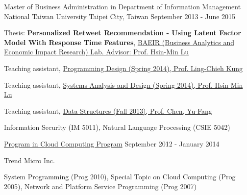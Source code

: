 

\begin{cventries}

  \cventry
    {Master of Business Administration in Department of Information Management} %
    {National Taiwan University} %
    {Taipei City, Taiwan} %
    {September 2013 - June 2015} %
    {
      \begin{cvitems} %
        \item {Thesis: \textbf{Personalized Retweet Recommendation - Using Latent Factor Model With Response Time Features}, \href{http://im.ntu.edu.tw/~lu/research_dir.htm}{BAEIR (Business Analytics and Economic Impact Research) Lab. Advisor: Prof. Hsin-Min Lu}}
        \item {Teaching assistant, \href{http://www.im.ntu.edu.tw/~lckung/courses/old/PD14/}{Programming Design (Spring 2014), Prof. Ling-Chieh Kung}}
        \item {Teaching assistant, \href{https://nol.ntu.edu.tw/nol/coursesearch/print_table.php?course_id=705\%2031200&class=&dpt_code=7050&ser_no=63330&semester=102-2&lang=CH}{Systems Analysis and Design (Spring 2014), Prof. Hsin-Min Lu}}
        \item {Teaching assistant, \href{https://nol.ntu.edu.tw/nol/coursesearch/print_table.php?course_id=705\%2021200&class=&dpt_code=7050&ser_no=71181&semester=102-1&lang=CH}{Data Structures (Fall 2013), Prof. Chen, Yu-Fang}}
        \item {Information Security (IM 5011), Natural Language Processing (CSIE 5042)}
      \end{cvitems}
    }

  \cventry
    {\href{https://www.csie.ntu.edu.tw/cloud/}{Program in Cloud Computing Program}} %
    {} %
    {} %
    {September 2012 - January 2014} %
    {
      \begin{cvitems} %
        \item {Trend Micro Inc.}
        \item {System Programming (Prog 2010), Special Topic on Cloud Computing (Prog 2005), Network and Platform Service Programming (Prog 2007)}
      \end{cvitems}
    }


\end{cventries}
